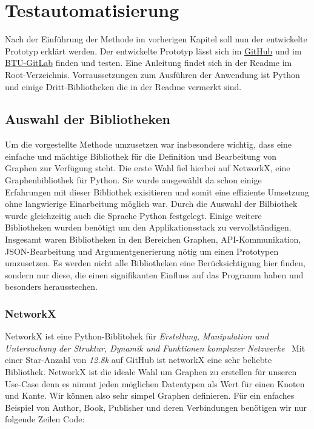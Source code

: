 \chapter{Testautomatisierung}
\label{testautomatisierung}

Nach der Einführung der Methode im vorherigen Kapitel soll nun der entwickelte Prototyp erklärt werden.
Der entwickelte Prototyp lässt sich im \href{https://github.com/gernhard1337/graphql-primepath-tester}{GitHub} und im \href{https://git.informatik.tu-cottbus.de/sst/abschlussarbeiten/master/lorenz_tom/graphql-tester-prototyp}{BTU-GitLab} finden und testen.
Eine Anleitung findet sich in der Readme im Root-Verzeichnis.
Vorraussetzungen zum Ausführen der Anwendung ist Python und einige Dritt-Bibliotheken die in der Readme vermerkt sind.

\section{Auswahl der Bibliotheken}

Um die vorgestellte Methode umzusetzen war insbesondere wichtig, dass eine einfache und mächtige Bibliothek für die Definition und Bearbeitung von Graphen zur Verfügung steht.
Die erste Wahl fiel hierbei auf NetworkX, eine Graphenbibliothek für Python.
Sie wurde ausgewählt da schon einige Erfahrungen mit dieser Bibliothek exisitieren und somit eine effiziente Umsetzung ohne langwierige Einarbeitung möglich war.
Durch die Auswahl der Bilbiothek wurde gleichzeitig auch die Sprache Python festgelegt.
Einige weitere Bibliotheken wurden benötigt um den Applikationsstack zu vervollständigen.
Insgesamt waren Bibliotheken in den Bereichen Graphen, API-Kommunikation, JSON-Bearbeitung und Argumentgenerierung nötig um einen Prototypen umzusetzen.
Es werden nicht alle Bibliotheken eine Berücksichtigung hier finden, sondern nur diese, die einen signifikanten Einfluss auf das Programm haben und besonders herausstechen.

\subsection{NetworkX}

NetworkX ist eine Python-Biblitohek für \textit{Erstellung, Manipulation und Untersuchung der Struktur, Dynamik und Funktionen komplexer Netzwerke}~\cite[vgl. Startseite]{networkx}
Mit einer Star-Anzahl von \textit{12.8k}\cite{networkxgithub} auf GitHub ist networkX eine sehr beliebte Bibliothek.
NetworkX ist die ideale Wahl um Graphen zu erstellen für unseren Use-Case denn es nimmt jeden möglichen Datentypen als Wert für einen Knoten und Kante.
Wir können also sehr simpel Graphen definieren.
Für ein enfaches Beispiel von Author, Book, Publisher und deren Verbindungen benötigen wir nur folgende Zeilen Code:

